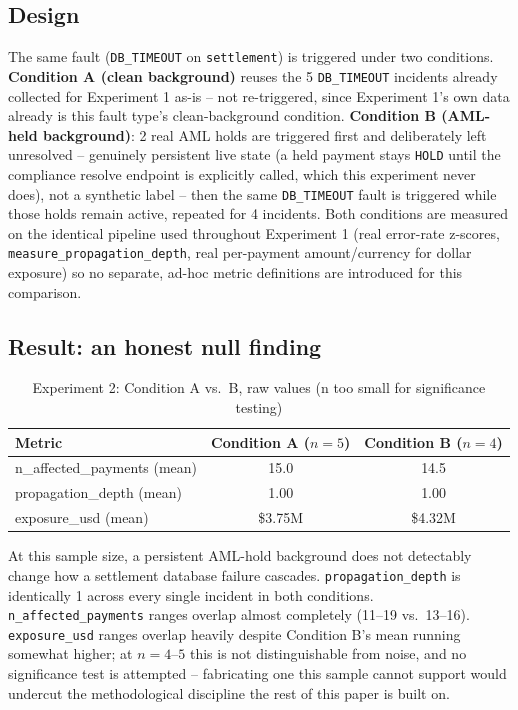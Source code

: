 \documentclass[conference]{IEEEtran}
\begin{document}
\subsection{Design}
The same fault (\texttt{DB\_TIMEOUT} on \texttt{settlement}) is triggered
under two conditions. \textbf{Condition A (clean background)} reuses the 5
\texttt{DB\_TIMEOUT} incidents already collected for Experiment 1 as-is --
not re-triggered, since Experiment 1's own data already is this fault
type's clean-background condition. \textbf{Condition B (AML-held
background)}: 2 real AML holds are triggered first and deliberately left
unresolved -- genuinely persistent live state (a held payment stays
\texttt{HOLD} until the compliance resolve endpoint is explicitly called,
which this experiment never does), not a synthetic label -- then the same
\texttt{DB\_TIMEOUT} fault is triggered while those holds remain active,
repeated for 4 incidents. Both conditions are measured on the identical
pipeline used throughout Experiment 1 (real error-rate z-scores,
\texttt{measure\_propagation\_depth}, real per-payment amount/currency for
dollar exposure) so no separate, ad-hoc metric definitions are introduced
for this comparison.

\subsection{Result: an honest null finding}
\begin{table}[h]
\centering
\caption{Experiment 2: Condition A vs.\ B, raw values (n too small for significance testing)}
\begin{tabular}{lcc}
\toprule
Metric & Condition A ($n=5$) & Condition B ($n=4$) \\
\midrule
n\_affected\_payments (mean) & 15.0 & 14.5 \\
propagation\_depth (mean) & 1.00 & 1.00 \\
exposure\_usd (mean) & \$3.75M & \$4.32M \\
\bottomrule
\end{tabular}
\end{table}

At this sample size, a persistent AML-hold background does not detectably
change how a settlement database failure cascades.
\texttt{propagation\_depth} is identically 1 across every single incident
in both conditions. \texttt{n\_affected\_payments} ranges overlap almost
completely (11--19 vs.\ 13--16). \texttt{exposure\_usd} ranges overlap
heavily despite Condition B's mean running somewhat higher; at $n=4$--$5$
this is not distinguishable from noise, and no significance test is
attempted -- fabricating one this sample cannot support would undercut the
methodological discipline the rest of this paper is built on.
\end{document}
